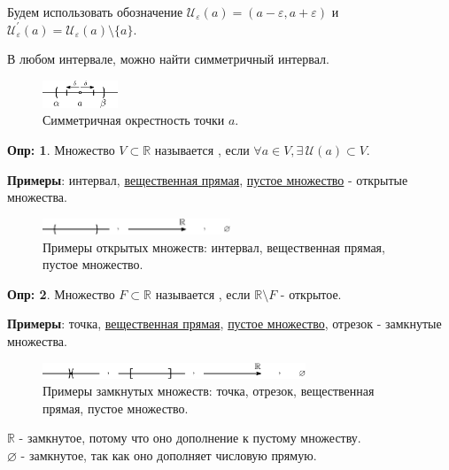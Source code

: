 \documentclass[12pt]{article}
\theoremstyle{definition}
\newtheorem{defn}{Опр:}
\begin{document}
Будем использовать обозначение $\mathcal{U}_\varepsilon(a) = (a- \varepsilon, a+ \varepsilon)$ и $\mathcal{U}_\varepsilon^\prime(a) = \mathcal{U}_\varepsilon(a) \setminus \{a\}$.

В любом интервале, можно найти симметричный интервал.
\begin{figure}[H]
	\centering
	\includegraphics[width=0.2\textwidth]{11_3.eps}
	\caption{Симметричная окрестность точки $a$.}
	\label{11_3}
\end{figure}


\begin{defn}
	Множество $V \subset \mathbb{R}$ называется , если $\forall a \in V, \exists \, \mathcal{U}(a) \subset V$.
\end{defn}

\textbf{Примеры}: интервал, \uline{вещественная прямая}, \uline{пустое множество} - открытые множества.

\begin{figure}[H]
	\centering
	\includegraphics[width=0.5\textwidth]{11_4.eps}
	\caption{Примеры открытых множеств: интервал, вещественная прямая, пустое множество.}
	\label{11_4}
\end{figure}

\begin{defn}
	Множество $F\subset \mathbb{R}$ называется , если $\mathbb{R} \setminus F$ - открытое.
\end{defn}

\textbf{Примеры}: точка, \uline{вещественная прямая}, \uline{пустое множество}, отрезок - замкнутые множества.

\begin{figure}[H]
	\centering
	\includegraphics[width=0.7\textwidth]{11_5.eps}
	\caption{Примеры замкнутых множеств: точка, отрезок, вещественная прямая, пустое множество.}
	\label{11_5}
\end{figure}

$\mathbb{R}$ - замкнутое, потому что оно дополнение к пустому множеству. \\
$\varnothing$ - замкнутое, так как оно дополняет числовую прямую.
\end{document}
